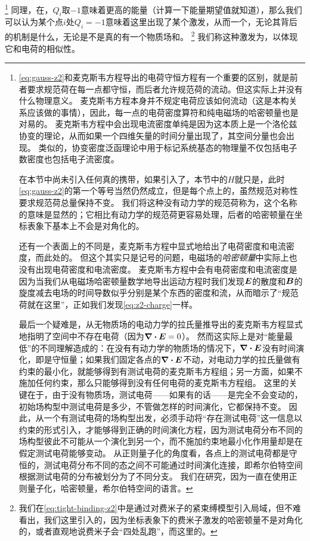 \footnote{
    \eqref{eq:gauss-z2}和麦克斯韦方程导出的电荷守恒方程有一个重要的区别，就是前者要求规范荷在每一点都守恒，而后者允许规范荷的流动。但这实际上并没有什么物理意义。
    麦克斯韦方程本身并不规定电荷应该如何流动（这是本构关系应该做的事情），因此，每一点的电荷密度算符和纯电磁场的哈密顿量也是对易的。
    麦克斯韦方程中会出现电流密度单纯是因为这本质上是一个洛伦兹协变的理论，从而如果一个四维矢量的时间分量出现了，其空间分量也会出现。
    类似的，协变密度泛函理论中用于标记系统基态的物理量不仅包括电子数密度也包括电子流密度。

    在本节中尚未引入任何真的携带，如果引入了，本节中的${H}$就只是，此时\eqref{eq:gauss-z2}的第一个等号当然仍然成立，但是每个点上的，虽然规范对称性要求规范荷总量保持不变。
    我们将这种没有动力学的规范荷称为，这个名称的意味是显然的；它相比有动力学的规范荷更容易处理，后者的哈密顿量在坐标表象下基本上不会是对角化的。

    还有一个表面上的不同是，麦克斯韦方程中显式地给出了电荷密度和电流密度，而此处的。
    但这个其实只是记号的问题，电磁场的\emph{哈密顿量}中实际上也没有出现电荷密度和电流密度。
    麦克斯韦方程中会有电荷密度和电流密度是因为当我们从电磁场哈密顿量数学地导出运动方程时我们发现$\vb*{E}$的散度和$\vb*{B}$的旋度减去电场的时间导数似乎分别是某个东西的密度和流，从而暗示了“规范荷就在这里”，正如我们发现\eqref{eq:z2-charge}一样。

    最后一个疑难是，从无物质场的电动力学的拉氏量推导出的麦克斯韦方程显式地指明了空间中不存在电荷（因为$\div{\vb*{E}} = 0$）。
    然而这实际上是对“能量最低”的不同理解造成的：在没有有动力学的物质场的情况下，$\div{\vb*{E}}$没有时间演化，即是守恒量；如果我们固定各点的$\div{\vb*{E}}$不动，对电动力学的拉氏量做有约束的最小化，就能够得到有测试电荷的麦克斯韦方程组；另一方面，如果不施加任何约束，那么只能够得到没有任何电荷的麦克斯韦方程组。
    这里的关键在于，由于没有物质场，测试电荷——如果有的话——是完全不会变动的，初始场构型中测试电荷是多少，不管做怎样的时间演化，它都保持不变。
    因此，从一个有测试电荷的场构型出发，必须手动将“存在测试电荷”这一信息以约束的形式引入，才能够得到正确的时间演化方程，因为测试电荷分布不同的场构型彼此不可能从一个演化到另一个，而不施加约束地最小化作用量却是在假定测试电荷能够变动。
    从正则量子化的角度看，各点上的测试电荷都是守恒的，测试电荷分布不同的态之间不可能通过时间演化连接，即希尔伯特空间根据测试电荷的分布被划分为了不同分支。
    我们在研究，因为一直在使用正则量子化，哈密顿量，希尔伯特空间的语言。
}%
同理，在，$Q_i$取$-1$意味着更高的能量（计算一下能量期望值就知道），那么我们可以认为某个点$i$处$Q_i=-1$意味着这里出现了某个激发，从而一个，无论其背后的机制是什么，无论是不是真的有一个物质场和。%
\footnote{
    我们在\eqref{eq:tight-binding-z2}中是通过对费米子的紧束缚模型引入局域，但不难看出，我们这里引入的，因为坐标表象下的费米子激发的哈密顿量不是对角化的，或者直观地说费米子会“四处乱跑”，而这里的。
}%
我们称这种激发为，以体现它和电荷的相似性。

